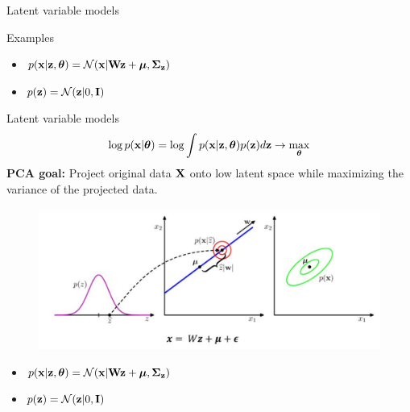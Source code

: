 \begin{frame}{Latent variable models}
\begin{block}{Examples}
\begin{minipage}[t]{0.53\columnwidth}
\begin{figure}
		\end{figure}
		\vspace{-0.5cm}
		\begin{itemize}
	        \item $p(\mathbf{x} | \mathbf{z}, \boldsymbol{\theta}) = \mathcal{N}(\mathbf{x} | \mathbf{W} \mathbf{z} + \boldsymbol{\mu}, \boldsymbol{\Sigma}_{\mathbf{z}})$
	        \item $p(\mathbf{z}) = \mathcal{N}(\mathbf{z} | 0, \mathbf{I})$
	    \end{itemize}
	\end{minipage}
	\end{block}
\end{frame}
\begin{frame}{Latent variable models}
    \[
    \log p(\mathbf{x} | \boldsymbol{\theta}) = \log \int p(\mathbf{x} | \mathbf{z}, \boldsymbol{\theta}) p(\mathbf{z}) d\mathbf{z} \rightarrow \max_{\boldsymbol{\theta}}
    \]
	\textbf{PCA goal:} Project original data $\mathbf{X}$ onto low latent space while maximizing the variance of the projected data. 
	\begin{figure}
		\centering
		\includegraphics[width=.7\linewidth]{figs/bayesian_pca.png}
	\end{figure}
	\vspace{-0.5cm}
	\begin{itemize}
        \item $p(\mathbf{x} | \mathbf{z}, \boldsymbol{\theta}) = \mathcal{N}(\mathbf{x} | \mathbf{W} \mathbf{z} + \boldsymbol{\mu}, \boldsymbol{\Sigma}_{\mathbf{z}})$
        \item $p(\mathbf{z}) = \mathcal{N}(\mathbf{z} | 0, \mathbf{I})$
    \end{itemize}
    
    
\end{frame}
